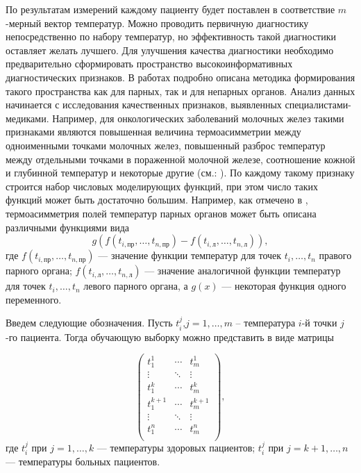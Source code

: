 По результатам измерений каждому пациенту будет поставлен в соответствие $m$-мерный вектор  температур. Можно проводить первичную диагностику непосредственно по набору температур, но эффективность такой диагностики оставляет желать лучшего. Для улучшения качества диагностики необходимо предварительно сформировать пространство высокоинформативных диагностических признаков. В работах \cite{los6,los7} подробно описана методика формирования такого пространства как для парных, так и для непарных органов. Анализ данных начинается с исследования качественных признаков, выявленных специалистами-медиками.
 Например, для онкологических заболеваний молочных желез такими признаками являются повышенная величина термоасимметрии между одноименными точками молочных желез,  повышенный разброс температур между отдельными точками в пораженной молочной железе, соотношение кожной и глубинной температур и некоторые другие (см.: \cite{an1,los2}). По каждому такому признаку строится набор числовых моделирующих функций, при этом число таких функций может быть достаточно большим. Например, как отмечено в \cite{los6}, термоасимметрия полей температур парных органов может быть описана различными функциями вида $$
 g(f(t_{i,\text{пр}},\dots,t_{n,\text{пр}})-f(t_{i,\text{л}},\dots,t_{n,\text{л}})),
 $$
 где $f(t_{i,\text{пр}},\dots,t_{n,\text{пр}})$ --- значение функции температур для точек $t_{i},\dots,t_{n}$ правого парного органа; $f(t_{i,\text{л}},\dots,t_{n,\text{л}})$ --- значение аналогичной функции температур для точек $t_{i},\dots,t_{n}$ левого парного органа, а $g(x)$ --- некоторая функция одного переменного.

 Введем следующие обозначения. Пусть $t_{i}^{j}$,$j=1,\dots,m$ -- температура $i$-й точки $j$-го пациента. Тогда обучающую выборку можно представить в виде матрицы

 $$
 \left(
 \begin{array}{lcr}
 t_{1}^{1} & \cdots & t_{m}^{1} \\
 \vdots & \ddots & \vdots \\
 t_{1}^{k}  & \cdots & t_{m}^{k} \\
 t_{1}^{k+1}  & \cdots & t_{m}^{k+1} \\
 \vdots & \ddots & \vdots \\
 t_{1}^{n}  & \cdots & t_{m}^{n} \\
 \end{array}
 \right),
 $$
 где $t_{i}^{j}$ при $j=1,\dots,k$ --- температуры здоровых пациентов; $t_{i}^{j}$ при $j=k+1,\dots,n$ --- температуры больных пациентов.

